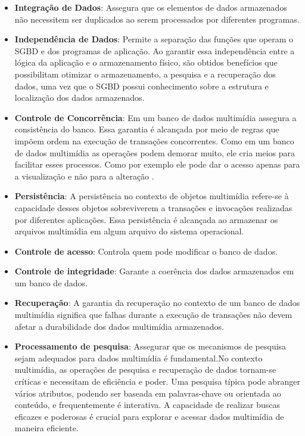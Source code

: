 \documentclass[12pt]{article}
\begin{document}
	\begin{itemize}
		
		\item \textbf{Integração de Dados}: Assegura que os elementos de dados armazenados não necessitem ser duplicados ao serem processados por diferentes programas.
		
		\item \textbf{Independência de Dados}: Permite a separação das funções que operam o SGBD e dos programas de aplicação. Ao garantir essa independência entre a lógica da aplicação e o armazenamento físico, são obtidos benefícios que possibilitam otimizar o armazenamento, a pesquisa e a recuperação dos dados, uma vez que o SGBD possui conhecimento sobre a estrutura e localização dos dados armazenados.
		
		\item  \textbf{Controle de Concorrência}: Em um  banco de dados multimídia assegura a consistência do banco. Essa garantia é alcançada por meio de regras que impõem ordem na execução de transações concorrentes. Como em um banco de dados multimídia as operações podem demorar muito, ele cria meios para facilitar esses processos. Como por exemplo ele pode dar o acesso apenas para a visualização e não para a alteração .
		
		\item \textbf{Persistência}: A persistência no contexto de objetos multimídia refere-se à capacidade desses objetos sobreviverem a transações e invocações realizadas por diferentes aplicações. Essa persistência é alcançada ao armazenar os arquivos multimídia em algum arquivo do sistema operacional. 
		
		
		\item \textbf {Controle de acesso}: Controla quem pode modificar o banco de dados.
		
		\item \textbf {Controle de integridade}: Garante a coerência dos dados armazenados em um banco de dados.
		
		\item \textbf{ Recuperação}: A garantia da recuperação no contexto de um banco de dados multimídia significa que falhas durante a execução de transações não devem afetar a durabilidade dos dados multimídia armazenados.
		
		\item \textbf {Processamento de pesquisa}: Assegurar que os mecanismos de pesquisa sejam adequados para dados multimídia é fundamental.No contexto multimídia, as operações de pesquisa e recuperação de dados tornam-se críticas e necessitam de eficiência e poder. Uma pesquisa típica pode abranger vários atributos, podendo ser baseada em palavras-chave ou orientada ao conteúdo, e frequentemente é interativa. A capacidade de realizar buscas eficazes e poderosas é crucial para explorar e acessar dados multimídia de maneira eficiente.
		

\end{itemize}
\end{document}
